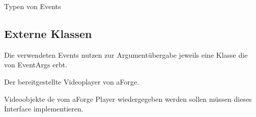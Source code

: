 Typen von Events


\pagebreak
\subsection{Externe Klassen}



Die verwendeten Events nutzen zur Argumentübergabe jeweils eine Klasse die von EventArgs erbt.


Der bereitgestellte Videoplayer von aForge.


Videoobjekte de vom aForge Player wiedergegeben werden sollen müssen dieses Interface implementieren.
